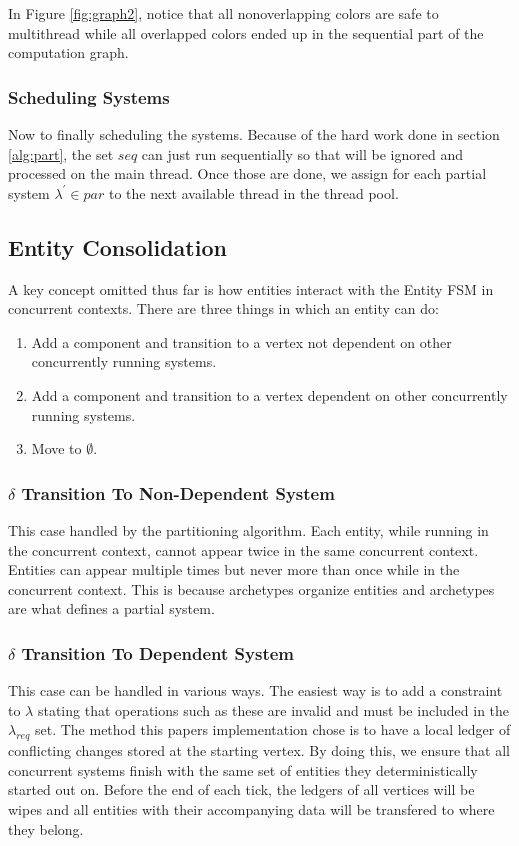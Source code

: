 In Figure \ref{fig:graph2}, notice that all nonoverlapping colors are safe to multithread while all overlapped colors ended up in the sequential part of the computation graph.

\subsubsection{Scheduling Systems}
Now to finally scheduling the systems. Because of the hard work done in section \ref{alg:part}, the set $seq$ can just run sequentially so that will be ignored and processed on the main thread. Once those are done, we assign for each partial system $\lambda^\prime \in par$ to the next available thread in the thread pool. 

\subsection{Entity Consolidation}
A key concept omitted thus far is how entities interact with the Entity FSM in concurrent contexts. There are three things in which an entity can do:
\begin{enumerate}
    \item Add a component and transition to a vertex not dependent on other concurrently running systems. 
    \item Add a component and transition to a vertex dependent on other concurrently running systems. 
    \item Move to $\emptyset$.
\end{enumerate}

\subsubsection{$\delta$ Transition To Non-Dependent System}
This case handled by the partitioning algorithm. Each entity, while running in the concurrent context, cannot appear twice in the same concurrent context. Entities can appear multiple times but never more than once while in the concurrent context. This is because archetypes organize entities and archetypes are what defines a partial system. 

\subsubsection{$\delta$ Transition To Dependent System}
This case can be handled in various ways. The easiest way is to add a constraint to $\lambda$ stating that operations such as these are invalid and must be included in the $\lambda_{req}$ set. The method this papers implementation chose is to have a local ledger of conflicting changes stored at the starting vertex. By doing this, we ensure that all concurrent systems finish with the same set of entities they deterministically started out on. Before the end of each tick, the ledgers of all vertices will be wipes and all entities with their accompanying data will be transfered to where they belong.

